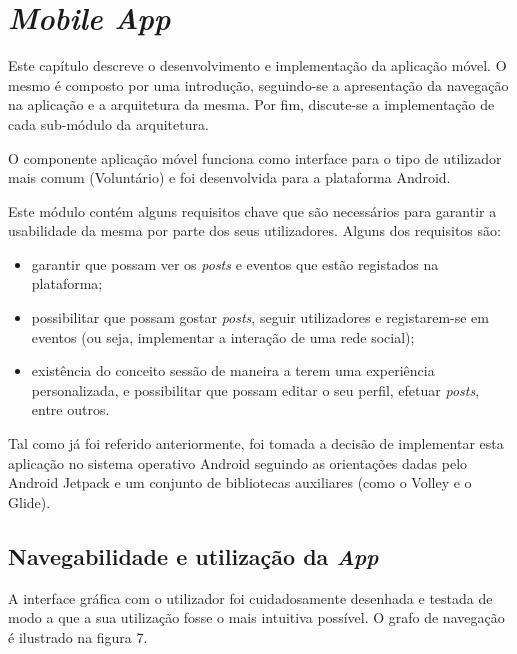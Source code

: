 \section{\textit{Mobile App}}

Este capítulo descreve o desenvolvimento e implementação da aplicação móvel. O mesmo é composto por uma introdução, seguindo-se a apresentação da navegação na aplicação e a arquitetura da mesma. Por fim, discute-se a implementação de cada sub-módulo da arquitetura.

\bigskip \bigskip

O componente aplicação móvel funciona como interface para o tipo de utilizador mais comum (Voluntário) e foi desenvolvida para a plataforma Android.

\par \bigskip \bigskip

Este módulo contém alguns requisitos chave que são necessários para garantir a usabilidade da mesma por parte dos seus utilizadores. Alguns dos requisitos são:

\begin{itemize}
	\item garantir que possam ver os \textit{posts} e eventos que estão registados na plataforma;
	\item possibilitar que possam gostar \textit{posts}, seguir utilizadores e registarem-se em eventos (ou seja, implementar a interação de uma rede social);
	\item existência do conceito sessão de maneira a terem uma experiência personalizada, e possibilitar que possam editar o seu perfil, efetuar \textit{posts}, entre outros.
\end{itemize}

\bigskip

Tal como já foi referido anteriormente, foi tomada a decisão de implementar esta aplicação no sistema operativo Android seguindo as orientações dadas pelo Android Jetpack e um conjunto de bibliotecas auxiliares (como o Volley e o Glide).

\bigskip \bigskip

\subsection{Navegabilidade e utilização da \textit{App}}

\bigskip

A interface gráfica com o utilizador foi cuidadosamente desenhada e testada de modo a que a sua utilização fosse o mais intuitiva possível. O grafo de navegação é ilustrado na figura 7.

